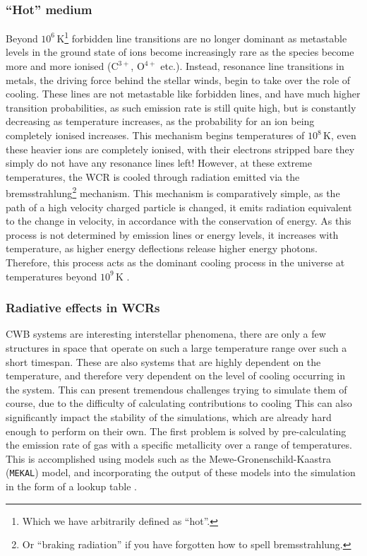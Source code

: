 \subsubsection{``Hot'' medium}

Beyond $10^6\,\si{\kelvin}$\footnote{Which we have arbitrarily defined as ``hot''.} forbidden line transitions are no longer dominant as metastable levels in the ground state of ions become increasingly rare as the species become more and more ionised ($\text{C}^{3+}$, $\text{O}^{4+}$ etc.).
Instead, resonance line transitions in metals, the driving force behind the stellar winds, begin to take over the role of cooling.
These lines are not metastable like forbidden lines, and have much higher transition probabilities, as such emission rate is still quite high, but is constantly decreasing as temperature increases, as the probability for an ion being completely ionised increases.
This mechanism begins  temperatures of $10^8\,\si{\kelvin}$, even these heavier ions are completely ionised, with their electrons stripped bare they simply do not have any resonance lines left!
However, at these extreme temperatures, the WCR is cooled through radiation emitted via the bremsstrahlung\footnote{Or ``braking radiation'' if you have forgotten how to spell bremsstrahlung.} mechanism.
This mechanism is comparatively simple, as the path of a high velocity charged particle is changed, it emits radiation equivalent to the change in velocity, in accordance with the conservation of energy.
As this process is not determined by emission lines or energy levels, it increases with temperature, as higher energy deflections release higher energy photons.
Therefore, this process acts as the dominant cooling process in the universe at temperatures beyond $10^9 \, \si{\kelvin}$
\parencite[Ch.~6]{longairHighEnergyAstrophysics2011}.

\subsubsection{Radiative effects in WCRs}

CWB systems are interesting interstellar phenomena, there are only a few structures in space that operate on such a large temperature range over such a short timespan.
These are also systems that are highly dependent on the temperature, and therefore very dependent on the level of cooling occurring in the system.
This can present tremendous challenges trying to simulate them of course, due to the difficulty of calculating contributions to cooling
This can also significantly impact the stability of the simulations, which are already hard enough to perform on their own.
The first problem is solved by pre-calculating the emission rate of gas with a specific metallicity over a range of temperatures.
This is accomplished using models such as the Mewe-Gronenschild-Kaastra (\texttt{MEKAL}) model, and incorporating the output of these models into the simulation in the form of a lookup table
\parencite{meweCalculatedXradiationOptically1985,kaastraSPEXHighresolutionCosmic2013}.

